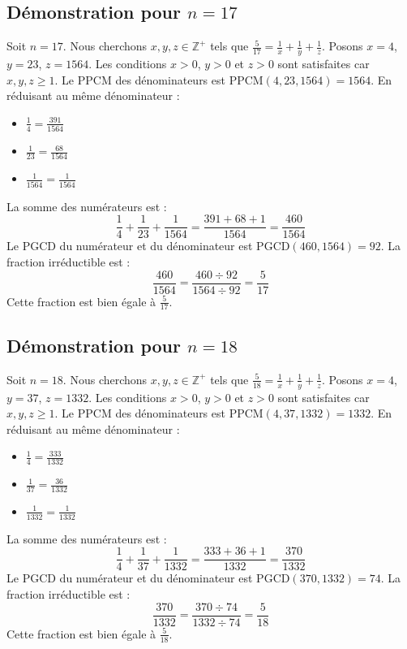 \documentclass[11pt,a4paper]{article}
\begin{document}
\subsection{Démonstration pour $n = 17$}
Soit $n = 17$. Nous cherchons $x, y, z \in \mathbb{Z}^{+}$ tels que $\frac{5}{17} = \frac{1}{x} + \frac{1}{y} + \frac{1}{z}$.
Posons $x = 4$, $y = 23$, $z = 1564$.
Les conditions $x > 0$, $y > 0$ et $z > 0$ sont satisfaites car $x, y, z \geq 1$.
Le PPCM des dénominateurs est $\text{PPCM}(4, 23, 1564) = 1564$.
En réduisant au même dénominateur :
\begin{itemize}
    \item $\frac{1}{4} = \frac{391}{1564}$
    \item $\frac{1}{23} = \frac{68}{1564}$
    \item $\frac{1}{1564} = \frac{1}{1564}$
\end{itemize}
La somme des numérateurs est :
$$ \frac{1}{4} + \frac{1}{23} + \frac{1}{1564} = \frac{391 + 68 + 1}{1564} = \frac{460}{1564} $$
Le PGCD du numérateur et du dénominateur est $\text{PGCD}(460, 1564) = 92$.
La fraction irréductible est :
$$ \frac{460}{1564} = \frac{460 \div 92}{1564 \div 92} = \frac{5}{17} $$
Cette fraction est bien égale à $\frac{5}{17}$.

\subsection{Démonstration pour $n = 18$}
Soit $n = 18$. Nous cherchons $x, y, z \in \mathbb{Z}^{+}$ tels que $\frac{5}{18} = \frac{1}{x} + \frac{1}{y} + \frac{1}{z}$.
Posons $x = 4$, $y = 37$, $z = 1332$.
Les conditions $x > 0$, $y > 0$ et $z > 0$ sont satisfaites car $x, y, z \geq 1$.
Le PPCM des dénominateurs est $\text{PPCM}(4, 37, 1332) = 1332$.
En réduisant au même dénominateur :
\begin{itemize}
    \item $\frac{1}{4} = \frac{333}{1332}$
    \item $\frac{1}{37} = \frac{36}{1332}$
    \item $\frac{1}{1332} = \frac{1}{1332}$
\end{itemize}
La somme des numérateurs est :
$$ \frac{1}{4} + \frac{1}{37} + \frac{1}{1332} = \frac{333 + 36 + 1}{1332} = \frac{370}{1332} $$
Le PGCD du numérateur et du dénominateur est $\text{PGCD}(370, 1332) = 74$.
La fraction irréductible est :
$$ \frac{370}{1332} = \frac{370 \div 74}{1332 \div 74} = \frac{5}{18} $$
Cette fraction est bien égale à $\frac{5}{18}$.
\end{document}
